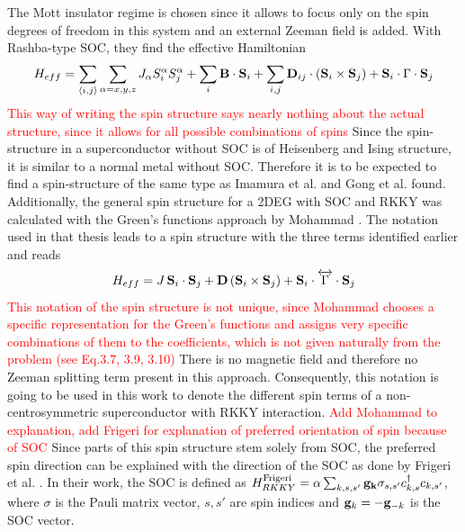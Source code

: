 The Mott insulator regime is chosen since it allows to focus only on the spin degrees of freedom in this system and an external Zeeman field is added.
With Rashba-type SOC, they find the effective Hamiltonian
\begin{align}\nonumber
    H_{eff} = \sum_{\langle i,j\rangle} \sum_{\alpha = x,y,z} J_{\alpha}S_i^{\alpha}S_j^{\alpha} + \sum_i \vb{B}\cdot \vb{S}_i + \sum_{i,j} \vb{D}_{ij}\cdot\left(\vb{S}_i \times \vb{S}_j \right) + \vb{S}_i \cdot \Gamma \cdot \vb{S}_j
\end{align}
\textcolor{red}{This way of writing the spin structure says nearly nothing about the actual structure, since it allows for all possible combinations of spins}\newline
Since the spin-structure in a superconductor without SOC is of Heisenberg and Ising structure, it is similar to a normal metal without SOC.
Therefore it is to be expected to find a spin-structure of the same type as Imamura et al. and Gong et al. found.\newline
Additionally, the general spin structure for a 2DEG with SOC and RKKY was calculated with the Green's functions approach by Mohammad \cite{valizadeh_mohammad_m_magnetic_2017}.
The notation used in that thesis leads to a spin structure with the three terms identified earlier and reads 
\begin{equation} \label{eq:spinstructure_mohammad}
    H_{eff} = J\,\vb{S}_i \cdot \vb{S}_j + \vb{D}\left( \vb{S}_i \times \vb{S}_j\right) + \vb{S}_i \cdot \overleftrightarrow{\Gamma} \cdot \vb{S}_j
\end{equation}
\textcolor{red}{This notation of the spin structure is not unique, since Mohammad chooses a specific representation for the Green's functions and assigns very specific combinations of them to the coefficients, which is not given naturally from the problem (see Eq.3.7, 3.9, 3.10)}\newline
There is no magnetic field and therefore no Zeeman splitting term present in this approach.
Consequently, this notation is going to be used in this work to denote the different spin terms of a non-centrosymmetric superconductor with RKKY interaction.
\textcolor{red}{Add Mohammad to explanation, add Frigeri for explanation of preferred orientation of spin because of SOC}
Since parts of this spin structure stem solely from SOC, the preferred spin direction can be explained with the direction of the SOC as done by Frigeri et al. \cite{frigeri2004superconductivity}.
In their work, the SOC is defined as $H_{RKKY}^{\text{Frigeri}} = \alpha \sum_{k,s,s'} \vb{g}_{\vb{k}}\sigma_{s,s'} c^{\dag}_{k,s}c_{k,s'}$, where $\sigma$ is the Pauli matrix vector, $s,s'$ are spin indices and $\vb{g}_k = - \vb{g}_{-k}$ is the SOC vector.
